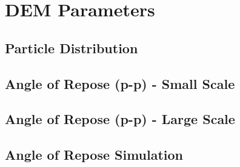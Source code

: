 
\chapter{DEM Parameters}
\label{cap:demparameters}

\lipsum[1]



\section{Particle Distribution}
\label{sec:particledistribution}

\lipsum[1]

% 



\lipsum[1]


\section{Angle of Repose (p-p) - Small Scale}
\label{sec:aor}


\lipsum[1]

\section{Angle of Repose (p-p) - Large Scale}
\label{sec:aorlargescale}


\lipsum[1]

\section{Angle of Repose Simulation}
\label{sec:aorsimulation}


\lipsum[1]

% 
% 
% 

